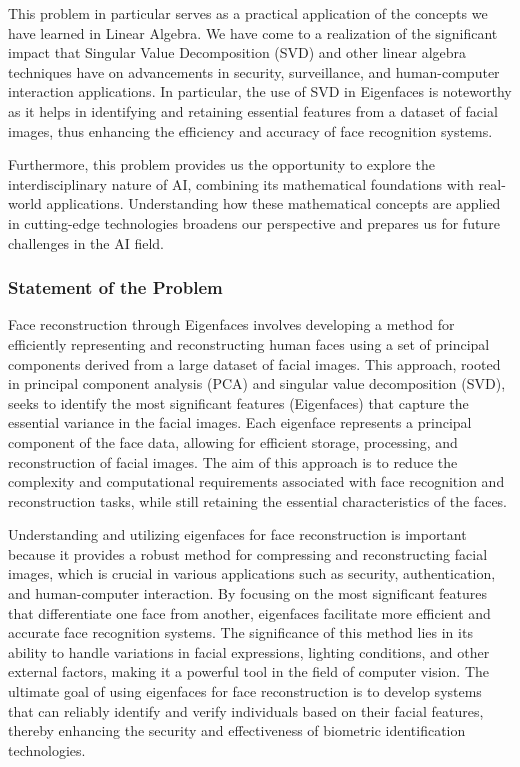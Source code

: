 \documentclass{article} %
\theoremstyle{definition}
\theoremstyle{remark}
\theoremstyle{plain}
\begin{document}
        This problem in particular serves as a practical application of the concepts we have learned in Linear Algebra. We have come to a realization of the significant impact that Singular Value Decomposition (SVD) and other linear algebra techniques have on advancements in security, surveillance, and human-computer interaction applications. In particular, the use of SVD in Eigenfaces is noteworthy as it helps in identifying and retaining essential features from a dataset of facial images, thus enhancing the efficiency and accuracy of face recognition systems.

        Furthermore, this problem provides us the opportunity to explore the interdisciplinary nature of AI, combining its mathematical foundations with real-world applications. Understanding how these mathematical concepts are applied in cutting-edge technologies broadens our perspective and prepares us for future challenges in the AI field.

    \subsubsection{Statement of the Problem}
        Face reconstruction through Eigenfaces involves developing a method for efficiently representing and reconstructing human faces using a set of principal components derived from a large dataset of facial images. This approach, rooted in principal component analysis (PCA) and singular value decomposition (SVD), seeks to identify the most significant features (Eigenfaces) that capture the essential variance in the facial images. Each eigenface represents a principal component of the face data, allowing for efficient storage, processing, and reconstruction of facial images. The aim of this approach is to reduce the complexity and computational requirements associated with face recognition and reconstruction tasks, while still retaining the essential characteristics of the faces.

        Understanding and utilizing eigenfaces for face reconstruction is important because it provides a robust method for compressing and reconstructing facial images, which is crucial in various applications such as security, authentication, and human-computer interaction. By focusing on the most significant features that differentiate one face from another, eigenfaces facilitate more efficient and accurate face recognition systems. The significance of this method lies in its ability to handle variations in facial expressions, lighting conditions, and other external factors, making it a powerful tool in the field of computer vision. The ultimate goal of using eigenfaces for face reconstruction is to develop systems that can reliably identify and verify individuals based on their facial features, thereby enhancing the security and effectiveness of biometric identification technologies.
\end{document}
